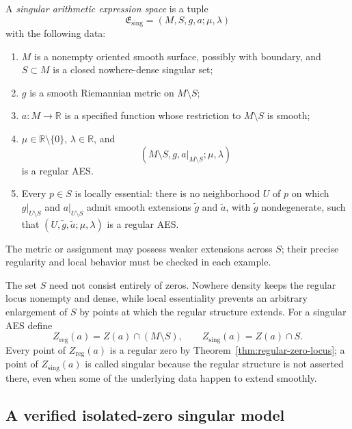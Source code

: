 \begin{definition}\label{def:singular-aes}
A \emph{singular arithmetic expression space} is a tuple
\[
 \mathfrak E_{\mathrm{sing}}=(M,S,g,a;\mu,\lambda)
\]
with the following data:
\begin{enumerate}
\item \(M\) is a nonempty oriented smooth surface, possibly with boundary, and
      \(S\subset M\) is a closed nowhere-dense singular set;
\item \(g\) is a smooth Riemannian metric on \(M\setminus S\);
\item \(a:M\to\mathbb R\) is a specified function whose restriction to
      \(M\setminus S\) is smooth;
\item \(\mu\in\mathbb R\setminus\{0\}\), \(\lambda\in\mathbb R\), and
      \[
      (M\setminus S,g,a|_{M\setminus S};\mu,\lambda)
      \]
      is a regular AES.
\item Every \(p\in S\) is locally essential: there is no neighborhood \(U\) of
      \(p\) on which \(g|_{U\setminus S}\) and \(a|_{U\setminus S}\) admit
      smooth extensions \(\widetilde g\) and \(\widetilde a\), with
      \(\widetilde g\) nondegenerate, such that
      \((U,\widetilde g,\widetilde a;\mu,\lambda)\) is a regular AES.
\end{enumerate}
The metric or assignment may possess weaker extensions across \(S\); their precise
regularity and local behavior must be checked in each example.
\end{definition}

The set \(S\) need not consist entirely of zeros.  Nowhere density keeps the regular
locus nonempty and dense, while local essentiality prevents an arbitrary enlargement
of \(S\) by points at which the regular structure extends.  For a singular AES define
\begin{equation}\label{eq:regular-singular-zero-parts}
 Z_{\mathrm{reg}}(a)=Z(a)\cap(M\setminus S),
 \qquad
 Z_{\mathrm{sing}}(a)=Z(a)\cap S.
\end{equation}
Every point of \(Z_{\mathrm{reg}}(a)\) is a regular zero by
Theorem~\ref{thm:regular-zero-locus}; a point of
\(Z_{\mathrm{sing}}(a)\) is called singular because the regular structure is not
asserted there, even when some of the underlying data happen to extend smoothly.

\subsection{A verified isolated-zero singular model}

